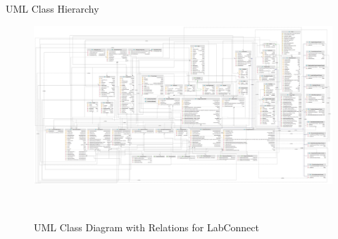 \documentclass[a4paper, 12pt]{article}
\begin{document}
        \begin{figure}[H]
            \centering
        \end{figure}
        \centerline{UML Class Hierarchy}

    \pagebreak

    \begin{landscape}
        \begin{figure}
            \centering
            \includegraphics[width=\dimexpr\paperheight-6cm\relax]{UML.jpg}
            \caption{UML Class Diagram with Relations for LabConnect}~\label{fig:class-diagram}
        \end{figure}
    \end{landscape}
\end{document}
